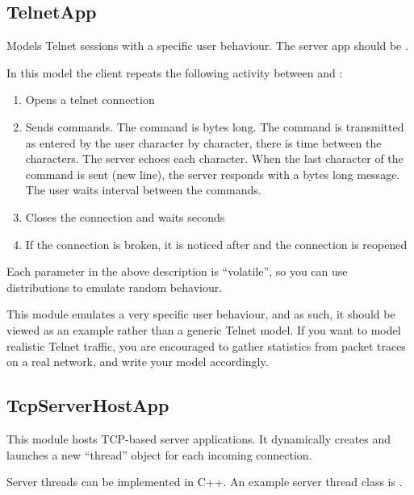 \subsection{TelnetApp}

Models Telnet sessions with a specific user behaviour.
The server app should be .

In this model the client repeats the following activity
between  and :

\begin{enumerate}
\item Opens a telnet connection
\item Sends  commands. The command is  bytes long.
      The command is transmitted as entered by the user character by character, 
      there is  time between the characters. The server echoes
      each character. When the last character of the command is sent (new line),
      the server responds with a  bytes long message.
      The user waits  interval between the commands.
\item Closes the connection and waits  seconds
\item If the connection is broken, it is noticed after 
      and the connection is reopened
\end{enumerate}

Each parameter in the above description is ``volatile'', so you can
use distributions to emulate random behaviour.

\begin{note}
This module emulates a very specific user behaviour, and as such,
it should be viewed as an example rather than a generic Telnet model.
If you want to model realistic Telnet traffic, you are encouraged
to gather statistics from packet traces on a real network, and
write your model accordingly.
\end{note}

\subsection{TcpServerHostApp}

This module hosts TCP-based server applications. It dynamically creates
and launches a new ``thread'' object for each incoming connection.

Server threads can be implemented in C++. An example server thread class is
.


